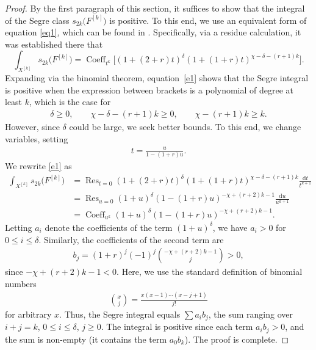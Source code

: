 \documentclass[10pt,a4paper]{amsart}
\numberwithin{equation}{section}
\begin{document}
\begin{proof}
By the first paragraph of this section, it suffices to show that the integral of the Segre class $s_{2k}\big(F^{[k]}\big)$ is positive. To this end, we use an equivalent form of equation \eqref{eq1}, which can be found in \cite[p.~11]{MOP}.
Specifically, via a residue calculation, it was established there that
\begin{equation}\label{e1}
\int_{X^{[k]}} s_{2k}\big(F^{[k]}\big)=\operatorname{Coeff}_{ t^k} \bigl[(1+ (2+r)t)^{\delta} (1+(1+r)t)^{\chi -\delta - (r+1)k} \bigr].
\end{equation}
Expanding via the binomial theorem, equation~\eqref{e1} shows that the Segre integral is positive when the expression between brackets is a polynomial of degree at least $k$, which is the case for
\begin{gather*}
\delta\geq 0, \qquad \chi- \delta - (r+1)k\geq 0,\qquad \chi-(r+1)k\geq k.
\end{gather*}
However, since $\delta$ could be large, we seek better bounds. To this end, we change variables, setting \begin{gather*}
t=\frac{u}{1-(1+r)u}.
\end{gather*}
We rewrite \eqref{e1} as
\begin{align*}
\int_{X^{[k]}} s_{2k}\big(F^{[k]}\big)&=\operatorname{Res}_{t=0} (1+ (2+r)t)^{\delta} (1+(1+r)t)^{\chi -\delta - (r+1)k} \frac{\mathrm dt}{t^{k+1}}
\\
&= \operatorname{Res}_{u=0} (1+u)^{\delta} (1-(1+r)u)^{-\chi + (r+2) k-1} \frac{\mathrm du}{u^{k+1}}
\\
&= \operatorname{Coeff}_{u^k} (1+u)^{\delta} (1-(1+r)u)^{-\chi + (r+2) k-1}.
\end{align*}
Letting $a_i$ denote the coefficients of the term $(1+u)^{\delta}$, we have $a_i>0$ for $0\leq i\leq \delta$. Similarly, the coefficients of the second term are
\begin{gather*}
b_j=(1+r)^j (-1)^j \binom{-\chi +(r+2)k-1}{j}>0,
\end{gather*}
since $-\chi+(r+2)k-1<0$. Here, we use the standard definition of binomial numbers
\begin{gather*}
\binom{x}{j}=\frac{x(x-1)\cdots (x-j+1)}{j!}
\end{gather*}
for arbitrary $x$. Thus, the Segre integral equals $\sum a_i b_j$, the sum ranging over $i+j=k$, $0\leq i\leq \delta$, $j\geq 0$. The integral is positive since each term $a_ib_j>0$, and the sum is non-empty (it contains the term $a_0b_k$). The proof is complete.
\end{proof}
\end{document}
